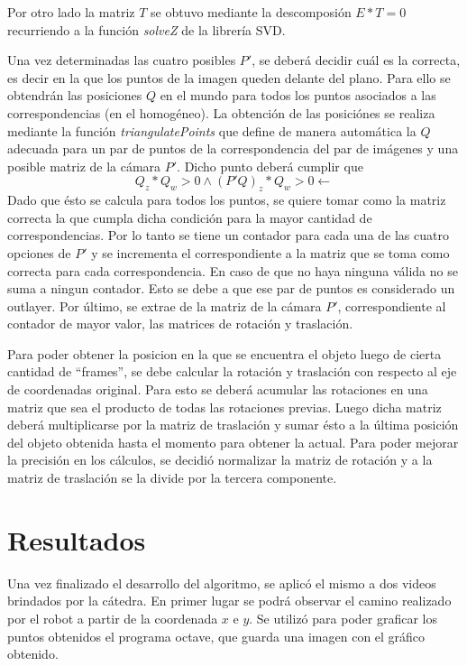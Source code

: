 \documentclass[10pt, a4paper,english,spanish,hidelinks]{article}
\begin{document}
Por otro lado la matriz $T$ se obtuvo mediante la descomposión $E * T = 0$ recurriendo
a la función \textit{solveZ} de la librería SVD. 

Una vez determinadas las cuatro posibles $P'$, se deberá decidir cuál es la correcta,
es decir en la que los puntos de la imagen queden delante del plano. Para ello
se obtendrán las posiciones $Q$ en el mundo para todos los puntos asociados a las correspondencias (en el homogéneo). 
La obtención de las posiciónes se realiza mediante la función \textit{triangulatePoints}
que define de manera automática la $Q$ adecuada para un par de puntos de la 
correspondencia del par de imágenes y una posible
matriz de la cámara $P'$. Dicho punto deberá cumplir que 
\begin{equation}
 Q_z * Q_w > 0 \land (P'Q)_z * Q_w > 0 \leftarrow
\end{equation}
Dado que ésto se calcula para todos los puntos, se quiere tomar como la matriz correcta la que cumpla 
dicha condición para la mayor cantidad de correspondencias. Por lo tanto  se tiene un contador para cada una de las
cuatro opciones de $P'$ y se incrementa el correspondiente a la matriz que se toma como correcta para cada correspondencia.
En caso de que no haya ninguna válida no se suma a ningun contador. Esto se debe a que ese par de puntos es considerado un outlayer.
Por último, se extrae de la matriz de la cámara $P'$, correspondiente al contador de mayor valor, las matrices de rotación y traslación. 


Para poder obtener la posicion en la que se encuentra el objeto luego de cierta cantidad
de ``frames'', se debe calcular la rotación y traslación con respecto al eje de coordenadas original.
Para esto se deberá acumular las rotaciones en una matriz que sea el producto de todas las rotaciones previas.
Luego dicha matriz deberá multiplicarse por la matriz de traslación y sumar ésto a la última posición del objeto obtenida hasta el momento para obtener la actual.
Para poder mejorar la precisión en los cálculos, se decidió normalizar la matriz de rotación
y a la matriz de traslación se la divide por la tercera componente. 

\newpage
\section{Resultados}
Una vez finalizado el desarrollo del algoritmo, se aplicó el mismo a dos videos 
brindados por la cátedra. En primer lugar se podrá observar el camino realizado por el
robot a partir de la coordenada $x$ e $y$. Se utilizó para poder graficar los puntos
obtenidos el programa octave, que
guarda una imagen con el gráfico obtenido. 
\end{document}
